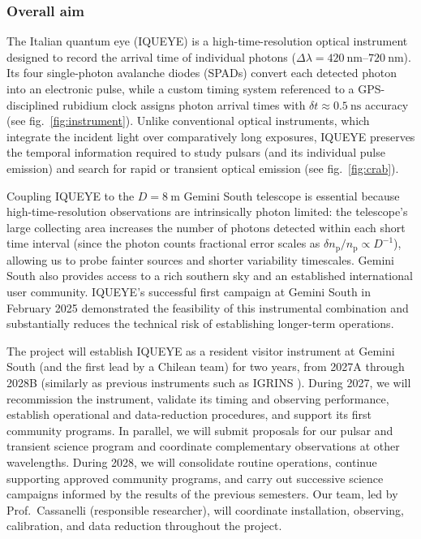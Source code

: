 \documentclass[
    11pt,
    a4paper,
    ]{article}
\begin{document}
\subsubsection{Overall aim}
The Italian quantum eye (IQUEYE) \cite{2009A&A...508..531N,2024CoSka..54b..29Z} is a high-time-resolution optical instrument designed to record the arrival time of individual photons ($\Delta\lambda = \qtyrange{420}{720}{\nano\m}$). Its four single-photon avalanche diodes (SPADs) convert each detected photon into an electronic pulse, while a custom timing system referenced to a GPS-disciplined rubidium clock assigns photon arrival times with $\delta{t}\approx\qty{0.5}{\nano\s}$ accuracy (see fig.\ \ref{fig:instrument}). Unlike conventional optical instruments, which integrate the incident light over comparatively long exposures, IQUEYE preserves the temporal information required to study pulsars (and its individual pulse emission) and search for rapid or transient optical emission (see fig.\ \ref{fig:crab}).

Coupling IQUEYE to the $D = \qty{8}{\m}$ Gemini South telescope is essential because high-time-resolution observations are intrinsically photon limited: the telescope's large collecting area increases the number of photons detected within each short time interval (since the photon counts fractional error scales as $\delta{n_\text{p}}/n_\text{p}\propto{D^{-1}}$), allowing us to probe fainter sources and shorter variability timescales. Gemini South also provides access to a rich southern sky and an established international user community. IQUEYE's successful first campaign at Gemini South in February 2025 \cite{2025SPIE13624E..1RC} demonstrated the feasibility of this instrumental combination and substantially reduces the technical risk of establishing longer-term operations.

The project will establish IQUEYE as a resident visitor instrument at Gemini South (and the first lead by a Chilean team) for two years, from 2027A through 2028B (similarly as previous instruments such as IGRINS \cite{10.1117/12.2312345}). During 2027, we will recommission the instrument, validate its timing and observing performance, establish operational and data-reduction procedures, and support its first community programs. In parallel, we will submit proposals for our pulsar and transient science program and coordinate complementary observations at other wavelengths. During 2028, we will consolidate routine operations, continue supporting approved community programs, and carry out successive science campaigns informed by the results of the previous semesters. Our team, led by Prof.\ Cassanelli (responsible researcher), will coordinate installation, observing, calibration, and data reduction throughout the project.
\end{document}
